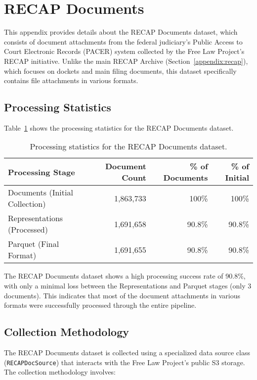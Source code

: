 \section{RECAP Documents}
\label{appendix:recap_docs}

This appendix provides details about the RECAP Documents dataset, which consists of document attachments from the federal judiciary's Public Access to Court Electronic Records (PACER) system collected by the Free Law Project's RECAP initiative. Unlike the main RECAP Archive (Section~\ref{appendix:recap}), which focuses on dockets and main filing documents, this dataset specifically contains file attachments in various formats.

\subsection{Processing Statistics}

Table~\ref{table:recap-docs-stats} shows the processing statistics for the RECAP Documents dataset.

\begin{table}[h]
\centering
\begin{tabular}{|l|r|r|r|}
\hline
\textbf{Processing Stage} & \textbf{Document Count} & \textbf{\% of Documents} & \textbf{\% of Initial} \\
\hline
Documents (Initial Collection) & 1,863,733 & 100\% & 100\% \\
Representations (Processed) & 1,691,658 & 90.8\% & 90.8\% \\
Parquet (Final Format) & 1,691,655 & 90.8\% & 90.8\% \\
\hline
\end{tabular}
\caption{Processing statistics for the RECAP Documents dataset.}
\label{table:recap-docs-stats}
\end{table}

The RECAP Documents dataset shows a high processing success rate of 90.8\%, with only a minimal loss between the Representations and Parquet stages (only 3 documents). This indicates that most of the document attachments in various formats were successfully processed through the entire pipeline.

\subsection{Collection Methodology}

The RECAP Documents dataset is collected using a specialized data source class (\texttt{RECAPDocSource}) that interacts with the Free Law Project's public S3 storage. The collection methodology involves:


